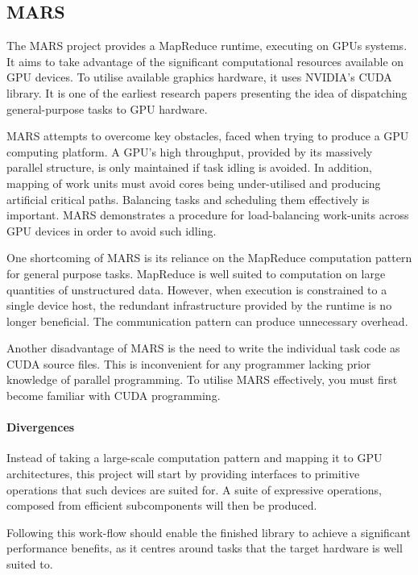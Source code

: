 \subsection{MARS}
The MARS\cite{mars} project provides a MapReduce\cite{mapreduce} runtime, executing on \acp{GPU} systems.
It aims to take advantage of the significant computational resources available on \ac{GPU} devices. To utilise available graphics hardware, it uses NVIDIA's \ac{CUDA} library. It is one of the earliest research papers presenting the idea of dispatching general-purpose tasks to \ac{GPU} hardware.

MARS attempts to overcome key obstacles, faced when trying to produce a \ac{GPU} computing platform.
A \ac{GPU}'s high throughput, provided by its massively parallel structure, is only maintained if task idling is avoided. In addition, mapping of work units must avoid cores being under-utilised and producing artificial critical paths. Balancing tasks and scheduling them effectively is important. MARS demonstrates a procedure for load-balancing work-units across \ac{GPU} devices in order to avoid such idling.

One shortcoming of MARS is its reliance on the MapReduce computation pattern for general purpose tasks. MapReduce is well suited to computation on large quantities of unstructured data. However, when execution is constrained to a single device host, the redundant infrastructure provided by the runtime is no longer beneficial. The communication pattern can produce unnecessary overhead.

Another disadvantage of MARS is the need to write the individual task code as \ac{CUDA} source files. This is inconvenient for any programmer lacking prior knowledge of parallel programming. To utilise MARS effectively, you must first become familiar with \ac{CUDA} programming.

\paragraph*{Divergences}
Instead of taking a large-scale computation pattern and mapping it to \ac{GPU} architectures, this project will start by providing interfaces to primitive operations that such devices are suited for. A suite of expressive operations, composed from efficient subcomponents will then be produced.

Following this work-flow should enable the finished library to achieve a significant performance benefits, as it centres around tasks that the target hardware is well suited to.


